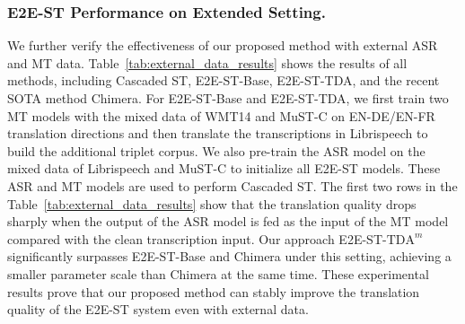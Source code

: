 \documentclass[letterpaper]{article} %
\begin{document}
\begin{table}[t]
    \normalsize  
    \centering
    \caption{BLEU scores on MuST-C tst-COMMON set in an extended setting. The external data includes 960 hours of LibriSpeech ASR data and WMT14 EN-DE/FR MT data.}
    \label{tab:external_data_results}
\end{table}

\subsubsection*{E2E-ST Performance on Extended Setting.}
We further verify the effectiveness of our proposed method with external ASR and MT data.
Table~\ref{tab:external_data_results} shows the results of all methods, including Cascaded ST, E2E-ST-Base, E2E-ST-TDA, and the recent SOTA method Chimera.
For E2E-ST-Base and E2E-ST-TDA, we first train two MT models with the mixed data of WMT14 and MuST-C on EN-DE/EN-FR translation directions and then translate the transcriptions in Librispeech to build the additional triplet corpus.
We also pre-train the ASR model on the mixed data of Librispeech and MuST-C to initialize all E2E-ST models.
These ASR and MT models are used to perform Cascaded ST.
The first two rows in the Table~\ref{tab:external_data_results} show that the translation quality drops sharply when the output of the ASR model is fed as the input of the MT model compared with the clean transcription input. %
Our approach E2E-ST-$\text{TDA}^{m}$ significantly surpasses E2E-ST-Base and Chimera under this setting, achieving a smaller parameter scale than Chimera at the same time. 
These experimental results prove that our proposed method can stably improve the translation quality of the E2E-ST system even with external data.
\end{document}
